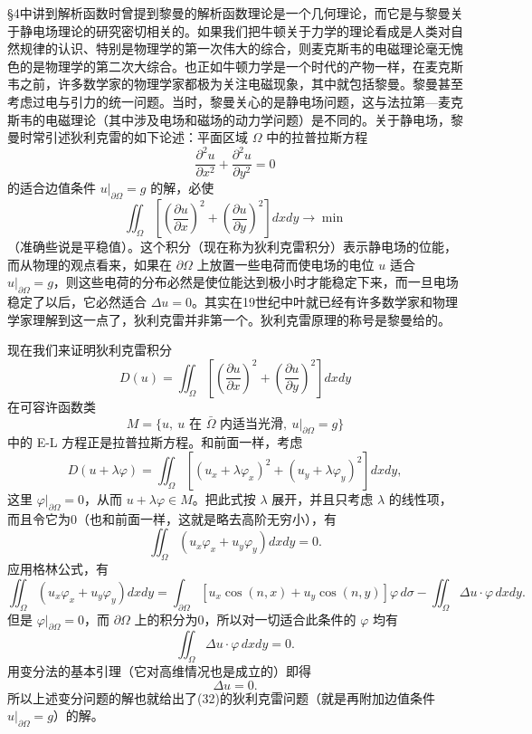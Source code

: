 §4中讲到解析函数时曾提到黎曼的解析函数理论是一个几何理论，而它是与黎曼关于静电场理论的研究密切相关的。如果我们把牛顿关于力学的理论看成是人类对自然规律的认识、特别是物理学的第一次伟大的综合，则麦克斯韦的电磁理论毫无愧色的是物理学的第二次大综合。也正如牛顿力学是一个时代的产物一样，在麦克斯韦之前，许多数学家的物理学家都极为关注电磁现象，其中就包括黎曼。黎曼甚至考虑过电与引力的统一问题。当时，黎曼关心的是静电场问题，这与法拉第—麦克斯韦的电磁理论（其中涉及电场和磁场的动力学问题）是不同的。关于静电场，黎曼时常引述狄利克雷的如下论述：平面区域 $\Omega$ 中的拉普拉斯方程
\[
 \frac{\partial^2u}{\partial x^2}+\frac{\partial^2u}{\partial y^2}=0
\]
的适合边值条件 $u|_{\partial\Omega}=g$ 的解，必使
\[
 \iint_\Omega\left[\left(\frac{\partial u}{\partial x}\right)^2
 +\left(\frac{\partial u}{\partial y}\right)^2\right]dxdy\to\min
\]
（准确些说是平稳值）。这个积分（现在称为狄利克雷积分）表示静电场的位能，而从物理的观点看来，如果在 $\partial\Omega$ 上放置一些电荷而使电场的电位 $u$ 适合 $u|_{\partial\Omega}=g$，则这些电荷的分布必然是使位能达到极小时才能稳定下来，而一旦电场稳定了以后，它必然适合 $\Delta u=0$。其实在19世纪中叶就已经有许多数学家和物理学家理解到这一点了，狄利克雷并非第一个。狄利克雷原理的称号是黎曼给的。

现在我们来证明狄利克雷积分
\begin{equation}
 D(u)=\iint_\Omega\left[\left(\frac{\partial u}{\partial x}\right)^2
 +\left(\frac{\partial u}{\partial y}\right)^2\right]dxdy
 \tag{31}
\end{equation}
在可容许函数类
\[
 M=\{u,\ u\text{ 在 }\bar\Omega\text{ 内适当光滑},\ u|_{\partial\Omega}=g\}
\]
中的 E-L 方程正是拉普拉斯方程。和前面一样，考虑
\[
 D(u+\lambda\varphi)
 =\iint_\Omega[(u_x+\lambda\varphi_x)^2+(u_y+\lambda\varphi_y)^2]dxdy,
\]
这里 $\varphi|_{\partial\Omega}=0$，从而 $u+\lambda\varphi\in M$。把此式按 $\lambda$ 展开，并且只考虑 $\lambda$ 的线性项，而且令它为0（也和前面一样，这就是略去高阶无穷小），有
\[
 \iint_\Omega(u_x\varphi_x+u_y\varphi_y)dxdy=0.
\]
应用格林公式，有
\[
 \iint_\Omega(u_x\varphi_x+u_y\varphi_y)dxdy
 =\int_{\partial\Omega}[u_x\cos(n,x)+u_y\cos(n,y)]\varphi\,d\sigma
 -\iint_\Omega\Delta u\cdot\varphi\,dxdy.
\]
但是 $\varphi|_{\partial\Omega}=0$，而 $\partial\Omega$ 上的积分为0，所以对一切适合此条件的 $\varphi$ 均有
\[
 \iint_\Omega\Delta u\cdot\varphi\,dxdy=0.
\]
用变分法的基本引理（它对高维情况也是成立的）即得
\begin{equation}
 \Delta u=0.
 \tag{32}
\end{equation}
所以上述变分问题的解也就给出了(32)的狄利克雷问题（就是再附加边值条件 $u|_{\partial\Omega}=g$）的解。

